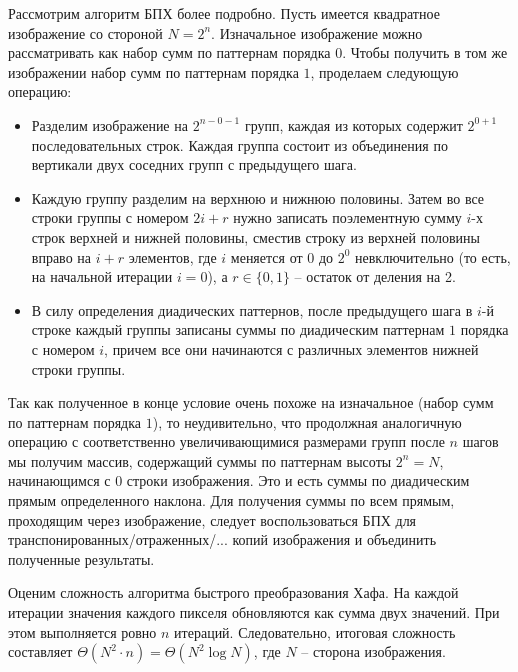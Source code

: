 Рассмотрим алгоритм БПХ более подробно. Пусть имеется квадратное изображение со стороной $N = 2^n$. Изначальное изображение можно рассматривать как набор сумм по паттернам порядка $0$. Чтобы получить в том же изображении набор сумм по паттернам порядка $1$, проделаем следующую операцию:
\begin{itemize}
\item
    Разделим изображение на $2^{n-0-1}$ групп, каждая из которых содержит $2^{0+1}$ последовательных строк. Каждая группа состоит из объединения по вертикали двух соседних групп с предыдущего шага.
\item
    Каждую группу разделим на верхнюю и нижнюю половины. Затем во все строки группы с номером $2i+r$ нужно записать поэлементную сумму $i$-х строк верхней и нижней половины, сместив строку из верхней половины вправо на $i+r$ элементов, где $i$ меняется от $0$ до $2^{0}$ невключительно (то есть, на начальной итерации $i=0$), а $r \in \{0, 1\}$ -- остаток от деления на 2.
\item
    В силу определения диадических паттернов, после предыдущего шага в $i$-й строке каждый группы записаны суммы по диадическим паттернам $1$ порядка с номером $i$, причем все они начинаются с различных элементов нижней строки группы.
\end{itemize}

Так как полученное в конце условие очень похоже на изначальное (набор сумм по паттернам порядка $1$), то неудивительно, что продолжная аналогичную операцию с соответственно увеличивающимися размерами групп после $n$ шагов мы получим массив, содержащий суммы по паттернам высоты $2^n = N$, начинающимся с $0$ строки изображения. Это и есть суммы по диадическим прямым определенного наклона. Для получения суммы по всем прямым, проходящим через изображение, следует воспользоваться БПХ для транспонированных/отраженных/... копий изображения и объединить полученные результаты.

Оценим сложность алгоритма быстрого преобразования Хафа. На каждой итерации значения каждого пикселя обновляются как сумма двух значений. При этом выполняется ровно $n$ итераций. Следовательно, итоговая сложность составляет $\Theta(N^2 \cdot n) = \Theta(N^2 \log N)$, где $N$ -- сторона изображения.

